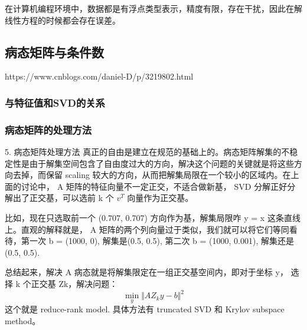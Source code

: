 在计算机编程环境中，数据都是有浮点类型表示，精度有限，存在干扰，因此在解线性方程的时候都会存在误差。

\subsection{病态矩阵与条件数}
https://www.cnblogs.com/daniel-D/p/3219802.html
\subsubsection{与特征值和SVD的关系}
\subsubsection{病态矩阵的处理方法}
5. 病态矩阵处理方法
真正的自由是建立在规范的基础上的。病态矩阵解集的不稳定性是由于解集空间包含了自由度过大的方向，解决这个问题的关键就是将这些方向去掉，而保留 scaling 较大的方向，从而把解集局限在一个较小的区域内。在上面的讨论中， A 矩阵的特征向量不一定正交，不适合做新基， SVD 分解正好分解出了正交基，可以选前 k 个 $v^T$ 向量作为正交基。

比如，现在只选取前一个 (0.707, 0.707) 方向作为基，解集局限咋 y = x 这条直线上。直观的解释就是， A 矩阵的两个列向量过于类似，我们就可以将它们等同看待，第一次 b = (1000, 0), 解集是(0.5, 0.5), 第二次 b = (1000, 0.001), 解集还是 (0.5, 0.5).

总结起来，解决 A 病态就是将解集限定在一组正交基空间内，即对于坐标 y， 选择 k 个正交基 Zk，解决问题：$$\min_{y}\Vert AZ_ky - b \Vert ^2$$
这个就是 reduce-rank model. 具体方法有 truncated SVD 和 Krylov subspace method。
